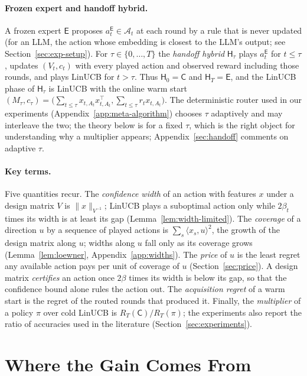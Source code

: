 \documentclass{article}
\theoremstyle{definition}
\theoremstyle{remark}
\theoremstyle{remark}
\newcommand{\Cold}{\mathsf{C}}
\newcommand{\Exp}{\mathsf{E}}
\newcommand{\Hyb}{\mathsf{H}}
\begin{document}
\paragraph{Frozen expert and handoff hybrid.}
A frozen expert $\Exp$ proposes $a_t^{\Exp}\in\mathcal A_t$ at each round by a
rule that is never updated (for an LLM, the action whose embedding is closest
to the LLM's output; see Section~\ref{sec:exp-setup}). For $\tau\in\{0,\dots,T\}$
the \emph{handoff hybrid} $\Hyb_\tau$ plays $a_t^{\Exp}$ for $t\le\tau$, updates
$(V_t,c_t)$ with every played action and observed reward including those
rounds, and plays LinUCB for $t>\tau$. Thus $\Hyb_0=\Cold$ and $\Hyb_T=\Exp$,
and the LinUCB phase of $\Hyb_\tau$ is LinUCB with the online warm start
$(M_\tau,c_\tau)=\bigl(\sum_{t\le\tau}x_{t,A_t}x_{t,A_t}^\top,\sum_{t\le\tau}r_tx_{t,A_t}\bigr)$.
The deterministic router used in our experiments
(Appendix~\ref{app:meta-algorithm}) chooses $\tau$ adaptively and may
interleave the two; the theory below is for a fixed $\tau$, which is the
right object for understanding why a multiplier appears; Appendix~\ref{sec:handoff}
comments on adaptive $\tau$.

\paragraph{Key terms.}
Five quantities recur. The \emph{confidence width} of an action with features
$x$ under a design matrix $V$ is $\|x\|_{V^{-1}}$; LinUCB plays a suboptimal
action only while $2\beta_t$ times its width is at least its gap
(Lemma~\ref{lem:width-limited}). The \emph{coverage} of a direction $u$ by a
sequence of played actions is $\sum_s\langle x_s,u\rangle^2$, the growth of the
design matrix along $u$; widths along $u$ fall only as its coverage grows
(Lemma~\ref{lem:loewner}, Appendix~\ref{app:widths}). The \emph{price} of $u$
is the least regret any available action pays per unit of coverage of $u$
(Section~\ref{sec:price}). A design
matrix \emph{certifies} an action once $2\beta$ times its width is below its
gap, so that the confidence bound alone rules the action out. The
\emph{acquisition regret} of a warm start is the regret of the routed rounds
that produced it. Finally, the \emph{multiplier} of a policy $\pi$ over cold
LinUCB is $R_T(\Cold)/R_T(\pi)$; the experiments also report the ratio of
accuracies used in the literature (Section~\ref{sec:experiments}).


\section{Where the Gain Comes From}
\label{sec:decomp}
\end{document}
